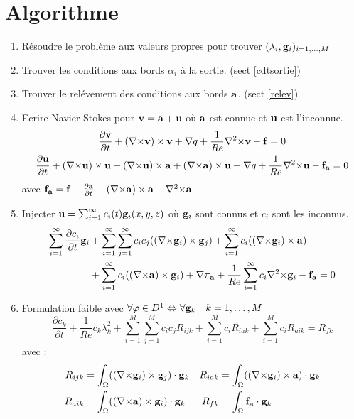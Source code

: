 \documentclass[a4paper,11pt]{article}
\begin{document}
\section{Algorithme}

\begin{enumerate}
\item
  Résoudre le problème aux valeurs propres pour trouver $(\lambda_i,{\mathbf{g}}_i)_{i=1,\dots,M}$
\item
  Trouver les conditions aux bords $\alpha_i$ à la sortie. (sect \ref{cdtsortie})
\item
  Trouver le relévement des conditions aux bords ${\mathbf{a}}$. (sect \ref{relev})
\item
  Ecrire Navier-Stokes pour ${\mathbf{v}}={\mathbf{a}}+{\mathbf{u}}$ où ${\mathbf{a}}$ est connue et ${\mathbf{u}}$ est l'inconnue.
  \begin{gather*}
    \frac{\partial {\mathbf{v}}}{\partial t} + ({\nabla\times}  {\mathbf{v}})\times {\mathbf{v}} + {\nabla} q + \frac{1}{Re}{\nabla^2\times}  {\mathbf{v}}-{\mathbf{f}} = 0\\
    \frac{\partial {\mathbf{u}}}{\partial t} + ({\nabla\times} {\mathbf{u}})\times {\mathbf{u}} + ({\nabla\times} {\mathbf{u}})\times {\mathbf{a}} +({\nabla\times} {\mathbf{a}})\times {\mathbf{u}} + {\nabla} q +\frac{1}{Re}{\nabla^2\times}  {\mathbf{u}} - {\mathbf{f_a}} = 0\\
  \end{gather*}
  avec ${\mathbf{f_a}}={\mathbf{f}}-\frac{\partial {\mathbf{a}}}{\partial t} - ({\nabla\times} {\mathbf{a}})\times {\mathbf{a}} - {\nabla^2\times}{\mathbf{a}}$
\item
  Injecter ${\mathbf{u}}=\sum_{i=1}^\infty c_i(t){\mathbf{g}}_i(x,y,z)$ où ${\mathbf{g}}_i$ sont connus et $c_i$ sont les inconnus.
  \begin{align*}
    \sum_{i=1}^\infty\frac{\partial c_i}{\partial t}{\mathbf{g}}_i &+ \sum_{i=1}^\infty\sum_{j=1}^\infty c_i c_j(({\nabla\times}{\mathbf{g}}_i)\times {\mathbf{g}}_j) + \sum_{i=1}^\infty c_i(({\nabla\times}{\mathbf{g}}_i)\times {\mathbf{a}})\\
    & + \sum_{i=1}^\infty c_i(({\nabla\times}{\mathbf{a}})\times {\mathbf{g}}_i) + {\nabla} \pi_{{\mathbf{a}}} +\frac{1}{Re}\sum_{i=1}^\infty c_i{\nabla^2\times}{\mathbf{g}}_i - {\mathbf{f_a}} = 0
  \end{align*}
\item
  Formulation faible avec $\forall \varphi\in D^1 \Leftrightarrow \forall {\mathbf{g}}_k\quad k=1,\dots,M$
  \begin{equation*}
    \frac{\partial c_k}{\partial t} + \frac{1}{Re}c_k\lambda_k^2 + \sum_{i=1}^M\sum_{j=1}^Mc_ic_jR_{ijk} + \sum_{i=1}^Mc_iR_{iak} + \sum_{i=1}^Mc_iR_{aik} = R_{fk}
  \end{equation*}
  avec :
  \begin{align*}
    R_{ijk} &= \int_\Omega(({\nabla\times}\mathbf{g}_i)\times \mathbf{g}_j)\cdot\mathbf{g}_k & R_{iak} &= \int_\Omega(({\nabla\times}\mathbf{g}_i)\times \mathbf{a})\cdot\mathbf{g}_k\\
    R_{aik} &= \int_\Omega(({\nabla\times}\mathbf{a})\times \mathbf{g}_i)\cdot\mathbf{g}_k & R_{fk} &= \int_\Omega\mathbf{f_a}\cdot\mathbf{g}_k
  \end{align*}
\end{enumerate}
\end{document}
